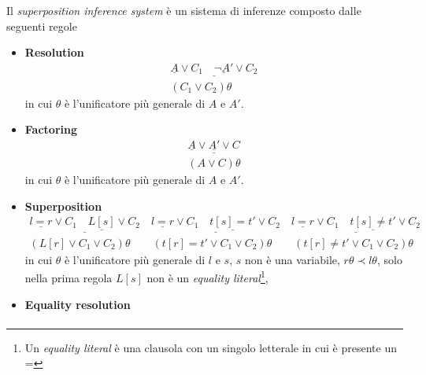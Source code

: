 \begin{definition}\label{supdef}
    Il \emph{superposition inference system} è un sistema di inferenze composto dalle seguenti regole
    \begin{itemize}
        \item \textbf{Resolution}
        \begin{equation}
            \begin{gathered}
                \underline{\underline{A} \lor C_1 \quad\underline{\lnot A'}\lor C_2}\\
                (C_1 \lor C_2)\theta
            \end{gathered}
        \end{equation}
        in cui $\theta$ è l'unificatore più generale di $A$ e $A'$.
        \item \textbf{Factoring}
        \begin{equation}
            \begin{gathered}
                \underline{\underline{A} \lor \underline{A'} \lor C}\\
                (A \lor C)\theta
            \end{gathered}
        \end{equation}
        in cui $\theta$ è l'unificatore più generale di $A$ e $A'$.
        \item \textbf{Superposition}
        \begin{equation}
            \begin{gathered}
                \underline{\underline{l=r} \lor C_1 \quad \underline{L[s]}\lor C_2} \quad \underline{\underline{l=r} \lor C_1 \quad \underline{t[s]=t'}\lor C_2} \quad \underline{\underline{l=r} \lor C_1 \quad \underline{t[s]\neq t'}\lor C_2}\\
                (L[r] \lor C_1 \lor C_2)\theta \qquad (t[r]=t' \lor C_1 \lor C_2)\theta \qquad (t[r]\neq t' \lor C_1 \lor C_2)\theta
            \end{gathered}
        \end{equation}
        in cui $\theta$ è l'unificatore più generale di $l$ e $s$, $s$ non è una variabile, 
        $r\theta\prec l\theta$, solo nella prima regola $L[s]$ non è un \emph{equality literal}\footnote{Un \emph{equality literal} è una clausola 
        con un singolo letterale in cui è presente un =},
        \item \textbf{Equality resolution}
        \begin{equation}
            \begin{gathered}

\end{gathered}
\end{equation}
\end{itemize}
\end{definition}
